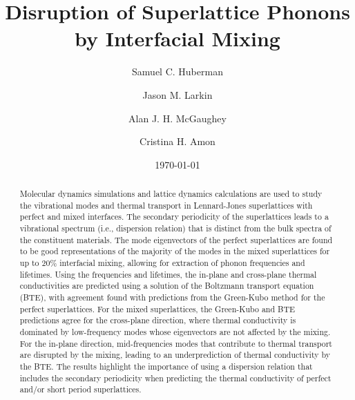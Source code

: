 \documentclass[aps,prb,preprint,preprintnumbers,amsmath,amssymb,floatfix,superscriptaddress]{revtex4}
\begin{document}
\title{Disruption of Superlattice Phonons by Interfacial Mixing}
\author{Samuel C. Huberman}
\author{Jason M. Larkin}
\author{Alan J. H. McGaughey}
\author{Cristina H. Amon}

\date{\today}%
\vspace{14mm}
  
\begin{abstract}
Molecular dynamics simulations and lattice dynamics calculations are used to study the vibrational modes and thermal transport in Lennard-Jones superlattices with perfect and mixed interfaces. The secondary periodicity of the superlattices leads to a vibrational spectrum (i.e., dispersion relation) that is distinct from the bulk spectra of the constituent materials. The mode eigenvectors of the perfect superlattices are found to be good representations of the majority of the modes in the mixed superlattices for up to 20\% interfacial mixing, allowing for extraction of phonon frequencies and lifetimes. Using the frequencies and lifetimes, the in-plane and cross-plane thermal conductivities are predicted using a solution of the Boltzmann transport equation (BTE), with agreement found with predictions from the Green-Kubo method for the perfect superlattices. For the mixed superlattices, the Green-Kubo and BTE predictions agree for the cross-plane direction, where thermal conductivity is dominated by low-frequency modes whose eigenvectors are not affected by the mixing. For the in-plane direction, mid-frequencies modes that contribute to thermal transport are disrupted by the mixing, leading to an underprediction of thermal conductivity by the BTE. The results highlight the importance of using a dispersion relation that includes the secondary periodicity when predicting the thermal conductivity of perfect and/or short period superlattices.
\end{abstract}
\maketitle
\end{document}

